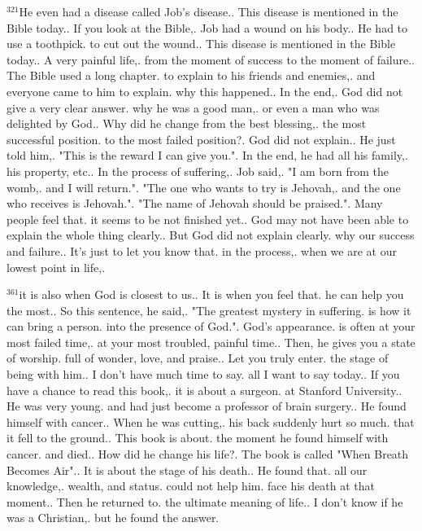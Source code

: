 \documentclass{book}
\begin{document}
$^{321}$He even had a disease called Job's disease..
This disease is mentioned in the Bible today..
If you look at the Bible,.
Job had a wound on his body..
He had to use a toothpick.
to cut out the wound..
This disease is mentioned in the Bible today..
A very painful life,.
from the moment of success to the moment of failure..
The Bible used a long chapter.
to explain to his friends and enemies,.
and everyone came to him to explain.
why this happened..
In the end,.
God did not give a very clear answer.
why he was a good man,.
or even a man who was delighted by God..
Why did he change from the best blessing,.
the most successful position.
to the most failed position?.
God did not explain..
He just told him,.
"This is the reward I can give you.".
In the end, he had all his family,.
his property, etc..
In the process of suffering,.
Job said,.
"I am born from the womb,.
and I will return.".
"The one who wants to try is Jehovah,.
and the one who receives is Jehovah.".
"The name of Jehovah should be praised.".
Many people feel that.
it seems to be not finished yet..
God may not have been able to explain the whole thing clearly..
But God did not explain clearly.
why our success and failure..
It's just to let you know that.
in the process,.
when we are at our lowest point in life,.

$^{361}$it is also when God is closest to us..
It is when you feel that.
he can help you the most..
So this sentence, he said,.
"The greatest mystery in suffering.
is how it can bring a person.
into the presence of God.".
God's appearance.
is often at your most failed time,.
at your most troubled, painful time..
Then, he gives you a state of worship.
full of wonder, love, and praise..
Let you truly enter.
the stage of being with him..
I don't have much time to say.
all I want to say today..
If you have a chance to read this book,.
it is about a surgeon.
at Stanford University..
He was very young.
and had just become a professor of brain surgery..
He found himself with cancer..
When he was cutting,.
his back suddenly hurt so much.
that it fell to the ground..
This book is about.
the moment he found himself with cancer.
and died..
How did he change his life?.
The book is called "When Breath Becomes Air"..
It is about the stage of his death..
He found that.
all our knowledge,.
wealth, and status.
could not help him.
face his death at that moment..
Then he returned to.
the ultimate meaning of life..
I don't know if he was a Christian,.
but he found the answer.
\end{document}
